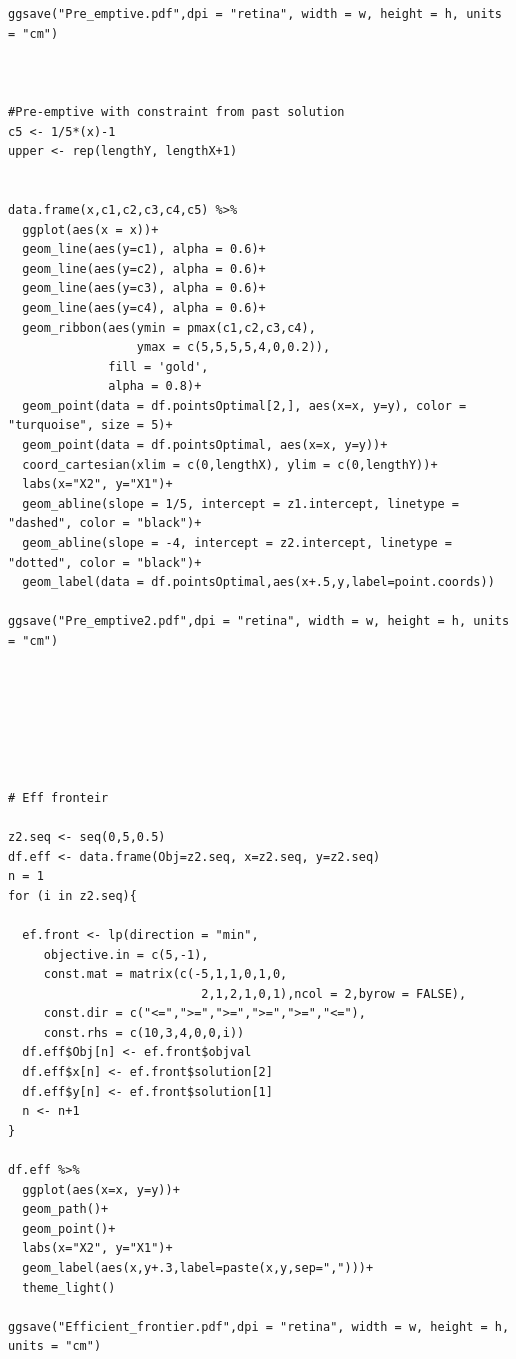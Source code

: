 \documentclass[a4paper,11pt]{article}
\begin{document}
\begin{verbatim}
ggsave("Pre_emptive.pdf",dpi = "retina", width = w, height = h, units = "cm")



#Pre-emptive with constraint from past solution
c5 <- 1/5*(x)-1
upper <- rep(lengthY, lengthX+1)


data.frame(x,c1,c2,c3,c4,c5) %>% 
  ggplot(aes(x = x))+
  geom_line(aes(y=c1), alpha = 0.6)+
  geom_line(aes(y=c2), alpha = 0.6)+
  geom_line(aes(y=c3), alpha = 0.6)+
  geom_line(aes(y=c4), alpha = 0.6)+
  geom_ribbon(aes(ymin = pmax(c1,c2,c3,c4),
                  ymax = c(5,5,5,5,4,0,0.2)),
              fill = 'gold', 
              alpha = 0.8)+
  geom_point(data = df.pointsOptimal[2,], aes(x=x, y=y), color = "turquoise", size = 5)+
  geom_point(data = df.pointsOptimal, aes(x=x, y=y))+
  coord_cartesian(xlim = c(0,lengthX), ylim = c(0,lengthY))+
  labs(x="X2", y="X1")+
  geom_abline(slope = 1/5, intercept = z1.intercept, linetype = "dashed", color = "black")+
  geom_abline(slope = -4, intercept = z2.intercept, linetype = "dotted", color = "black")+
  geom_label(data = df.pointsOptimal,aes(x+.5,y,label=point.coords))

ggsave("Pre_emptive2.pdf",dpi = "retina", width = w, height = h, units = "cm")







# Eff fronteir 

z2.seq <- seq(0,5,0.5)
df.eff <- data.frame(Obj=z2.seq, x=z2.seq, y=z2.seq)
n = 1
for (i in z2.seq){
  
  ef.front <- lp(direction = "min",
     objective.in = c(5,-1),
     const.mat = matrix(c(-5,1,1,0,1,0,
                           2,1,2,1,0,1),ncol = 2,byrow = FALSE),
     const.dir = c("<=",">=",">=",">=",">=","<="),
     const.rhs = c(10,3,4,0,0,i))
  df.eff$Obj[n] <- ef.front$objval
  df.eff$x[n] <- ef.front$solution[2]
  df.eff$y[n] <- ef.front$solution[1]
  n <- n+1
}

df.eff %>% 
  ggplot(aes(x=x, y=y))+
  geom_path()+
  geom_point()+
  labs(x="X2", y="X1")+
  geom_label(aes(x,y+.3,label=paste(x,y,sep=",")))+
  theme_light()
  
ggsave("Efficient_frontier.pdf",dpi = "retina", width = w, height = h, units = "cm")



\end{verbatim}


\newpage
\end{document}
